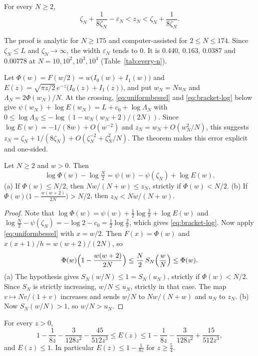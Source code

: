 \begin{theorem}\label{thm:every-n}
For every $N\ge2$,
\[
\zeta_N+\frac1{8\zeta_N}-\varepsilon_N<z_N<\zeta_N+\frac1{8\zeta_N}.
\]
\end{theorem}

The proof is analytic for $N\ge175$ and computer-assisted for $2\le N\le174$. Since
$\zeta_N\le L$ and $\zeta_N\to\infty$, the width $\varepsilon_N$ tends to $0$. It is $0.440$,
$0.163$, $0.0387$ and $0.00778$ at $N=10,10^2,10^3,10^4$ (Table~\ref{tab:every-n}).

Let $\Phi(w)=F(w/2)=w\bigl(I_0(w)+I_1(w)\bigr)$ and
$E(z)=\sqrt{\pi z/2}\,e^{-z}\bigl(I_0(z)+I_1(z)\bigr)$, and put $w_N=Nu_N$ and
$\Lambda_N=2\Phi(w_N)/N$. At the crossing, \eqref{eq:uniformbessel} and \eqref{eq:bracket-log}
below give
$\psi(w_N)+\log E(w_N)=L+c_0+\log\Lambda_N$ with $0\le\log\Lambda_N\le-\log(1-w_N(w_N+2)/(2N))$.
Since $\log E(w)=-1/(8w)+O(w^{-2})$ and $z_N=w_N+O(w_N^2/N)$, this suggests
$z_N=\zeta_N+1/(8\zeta_N)+O(\zeta_N^{-2}+\zeta_N^2/N)$. The theorem makes this error explicit and
one-sided.

\begin{lemma}\label{lem:bracket}
Let $N\ge2$ and $w>0$. Then
\begin{equation}\label{eq:bracket-log}
\log\Phi(w)-\log\tfrac N2=\psi(w)-\psi(\zeta_N)+\log E(w).
\end{equation}
(a) If $\Phi(w)\le N/2$, then $Nw/(N+w)\le z_N$, strictly if $\Phi(w)<N/2$.
(b) If $\Phi(w)\bigl(1-\frac{w(w+2)}{2N}\bigr)>N/2$, then $z_N<Nw/(N+w)$.
\end{lemma}

\begin{proof}
Note that $\log\Phi(w)=\psi(w)+\frac12\log\frac2\pi+\log E(w)$ and
$\log\frac N2-\psi(\zeta_N)=-\log2-c_0=\frac12\log\frac2\pi$, which gives \eqref{eq:bracket-log}.
Now apply \eqref{eq:uniformbessel} with $x=w/2$. Then $F(x)=\Phi(w)$ and
$x(x+1)/h=w(w+2)/(2N)$, so
\[
\Phi(w)\Bigl(1-\frac{w(w+2)}{2N}\Bigr)\le\frac N2\,S_N\Bigl(\frac wN\Bigr)\le\Phi(w).
\]
(a) The hypothesis gives $S_N(w/N)\le1=S_N(u_N)$, strictly if $\Phi(w)<N/2$. Since $S_N$ is
strictly increasing, $w/N\le u_N$, strictly in that case. The map $v\mapsto Nv/(1+v)$ increases
and sends $w/N$ to $Nw/(N+w)$ and $u_N$ to $z_N$. (b) Now $S_N(w/N)>1$, so $w/N>u_N$.
\end{proof}

\begin{lemma}\label{lem:bessel-bounds}
For every $z>0$,
\[
1-\frac1{8z}-\frac3{128z^2}-\frac{45}{512z^3}\le E(z)\le1-\frac1{8z}-\frac3{128z^2}+\frac{15}{512z^3},
\]
and $E(z)\le1$. In particular $E(z)\le1-\frac1{8z}$ for $z\ge\frac54$.
\end{lemma}

